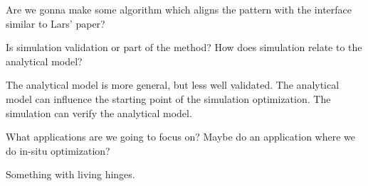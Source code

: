 Are we gonna make some algorithm which aligns the pattern with the interface similar to Lars' paper?

Is simulation validation or part of the method?
How does simulation relate to the analytical model?

The analytical model is more general, but less well validated.
The analytical model can influence the starting point of the simulation optimization.
The simulation can verify the analytical model.


What applications are we going to focus on?
Maybe do an application where we do in-situ optimization?

Something with living hinges.









